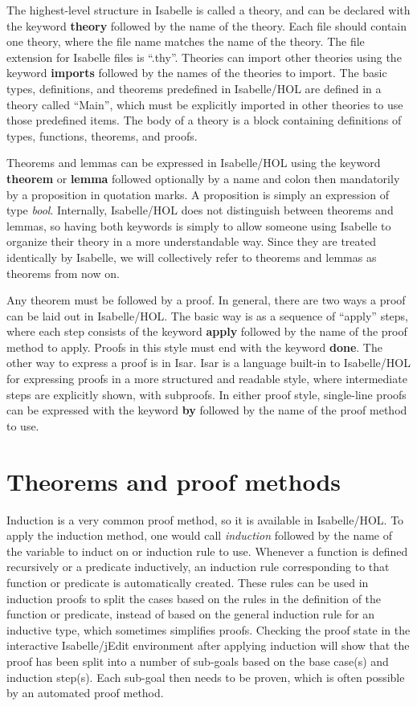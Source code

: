 \documentclass{article}
\begin{document}
The highest-level structure in Isabelle is called a theory, and can be declared 
with the keyword \textbf{theory} followed by the name of the theory. Each file 
should contain one theory, where the file name matches the name of the theory. 
The file extension for Isabelle files is ``.thy''. Theories can import other 
theories using the keyword \textbf{imports} followed by the names of the 
theories to import. The basic types, definitions, and theorems predefined in 
Isabelle/HOL are defined in a theory called ``Main'', which must be explicitly 
imported in other theories to use those predefined items. The body of a theory 
is a block containing definitions of types, functions, theorems, and proofs.

Theorems and lemmas can be expressed in Isabelle/HOL using the keyword
\textbf{theorem} or \textbf{lemma} followed optionally by a name and colon then
mandatorily by a proposition in quotation
marks. A proposition is simply an expression of type \textit{bool}. Internally,
Isabelle/HOL does not distinguish between theorems and lemmas, so having both
keywords is simply to allow someone using Isabelle to organize their theory in
a more understandable way. Since they are treated identically by Isabelle, we
will collectively refer to theorems and lemmas as theorems from now on.

Any theorem must be followed by a proof. In general, there are two ways a proof
can be laid out in Isabelle/HOL. The basic way is as a sequence of ``apply''
steps, where each step consists of the keyword \textbf{apply} followed by the
name of the proof method to apply. Proofs in this style must end with the
keyword \textbf{done}. The other way to express a proof is in Isar. Isar is a
language built-in to Isabelle/HOL for expressing proofs in a more structured
and readable style, where intermediate steps are explicitly shown, with
subproofs. In either proof style, single-line proofs can be expressed with the
keyword \textbf{by} followed by the name of the proof method to use.

\section{Theorems and proof methods}

Induction is a very common proof method, so it is available in Isabelle/HOL. To
apply the induction method, one would call \textit{induction} followed by the 
name of the variable to induct on or induction rule to use. Whenever a function 
is defined recursively or a predicate inductively, an induction rule 
corresponding to that function or predicate is automatically created. These 
rules can be used in induction proofs to split the cases based on the rules in 
the definition of the function or predicate, instead of based on the general 
induction rule for an inductive type, which sometimes simplifies proofs. 
Checking the proof state in the interactive Isabelle/jEdit environment after 
applying induction will show that the proof has been split into a number of 
sub-goals based on the base case(s) and induction step(s). Each sub-goal then 
needs to be proven, which is often possible by an automated proof method.
\end{document}
